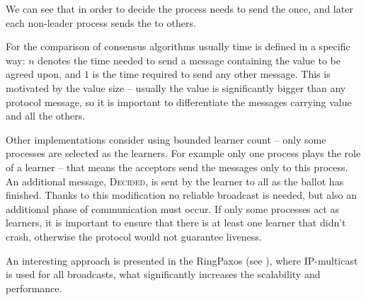 We can see that in order to decide the process needs to send the \propose[] once, and later each non-leader process sends the \accept to others.

For the comparison of consensus algorithms usually time is defined in a specific way: $n$ denotes the time needed to send a message containing the value to be agreed upon, and $1$ is the time required to send any other message. This is motivated by the value size -- usually the value is significantly bigger than any protocol message, so it is important to differentiate the messages carrying value and all the others.

Other implementations consider using bounded learner count -- only some processes are selected as the learners. For example only one process plays the role of a learner -- that means the acceptors send the \accept messages only to this process. An additional message, \textsc{Decided}, is sent by the learner to all as the ballot has finished. Thanks to this modification no reliable broadcast is needed, but also an additional phase of communication must occur. If only some processes act as learners, it is important to ensure that there is at least one learner that didn't crash, otherwise the protocol would not guarantee liveness.

An interesting approach is presented in the RingPaxos (see \cite{Mar10}), where IP-multicast is used for all broadcasts, what significantly increases the scalability and performance.
